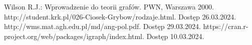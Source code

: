 
\begin{thebibliography}{4}
 Wilson R.J.: Wprowadzenie do teorii grafów. PWN, Warszawa 2000.
 http://student.krk.pl/026-Ciosek-Grybow/rodzaje.html. Dostęp 26.03.2024.
 http://wms.mat.agh.edu.pl/\texttildelow md/ang-pol.pdf. Dostęp 29.03.2024. 
 https://cran.r-project.org/web/packages/igraph/index.html. Dostęp 10.03.2024.
\end{thebibliography}